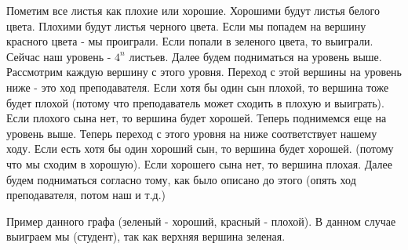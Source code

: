 \documentclass{article}
\begin{document}
Пометим все листья как плохие или хорошие. Хорошими будут листья белого цвета. Плохими будут листья черного цвета. Если мы попадем на вершину красного цвета - мы проиграли. Если попали в зеленого цвета, то выиграли. Сейчас наш уровень - $4^n$ листьев. Далее будем подниматься на уровень выше. Рассмотрим каждую вершину с этого уровня. Переход с этой вершины на уровень ниже - это ход преподавателя. Если хотя бы один сын плохой, то вершина тоже будет плохой (потому что преподаватель может сходить в плохую и выиграть). Если плохого сына нет, то вершина будет хорошей. Теперь поднимемся еще на уровень выше. Теперь переход с этого уровня на ниже соответствует нашему ходу. Если есть хотя бы один хороший сын, то вершина будет хорошей. (потому что мы сходим в хорошую). Если хорошего сына нет, то вершина плохая. Далее будем подниматься согласно тому, как было описано до этого (опять ход преподавателя, потом наш и т.д.)

Пример данного графа (зеленый - хороший, красный - плохой). В данном случае выиграем мы (студент), так как верхняя вершина зеленая.

\begin{figure}[!ht]
\end{figure}
\end{document}
